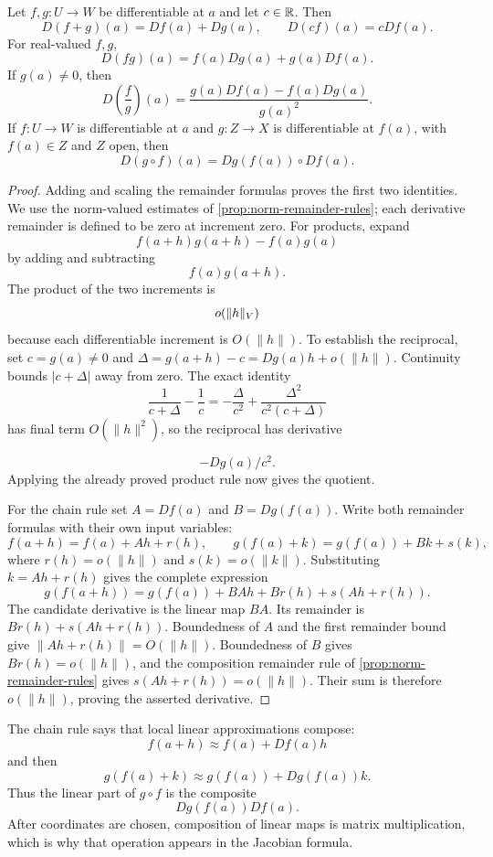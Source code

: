 \begin{proposition}
\label{prop:multivariable-derivative-rules}
Let $f,g:U\to W$ be differentiable at $a$ and let $c\in\mathbb{R}$.  Then
\[
D(f+g)(a)=Df(a)+Dg(a),
\qquad
D(cf)(a)=cDf(a).
\]
For real-valued $f,g$,
\[
D(fg)(a)=f(a)Dg(a)+g(a)Df(a).
\]
If $g(a)\ne0$, then
\[
D\left(\frac fg\right)(a)
=
\frac{g(a)Df(a)-f(a)Dg(a)}{g(a)^2}.
\]
If $f:U\to W$ is differentiable at $a$ and $g:Z\to X$ is differentiable at
$f(a)$, with $f(a)\in Z$ and $Z$ open, then
\[
D(g\circ f)(a)=Dg(f(a))\circ Df(a).
\]
\end{proposition}
\begin{proof}
Adding and scaling the remainder formulas proves the first two identities.
We use the norm-valued estimates of \cref{prop:norm-remainder-rules};
each derivative remainder is defined to be zero at increment zero.
For products, expand
\[
f(a+h)g(a+h)-f(a)g(a)
\]
by adding and subtracting
\[
f(a)g(a+h).
\]
The product of the two increments is
\[
o(\lVert h\rVert_V)
\]
because each differentiable increment is $O(\|h\|)$.
To establish the reciprocal, set $c=g(a)\ne0$ and
$\Delta=g(a+h)-c=Dg(a)h+o(\|h\|)$. Continuity bounds $|c+\Delta|$
away from zero. The exact identity
\[
\frac1{c+\Delta}-\frac1c=-\frac{\Delta}{c^2}
+\frac{\Delta^2}{c^2(c+\Delta)}
\]
has final term $O(\|h\|^2)$, so the reciprocal has derivative

\[
-Dg(a)/c^2.
\]
 Applying the already proved product rule now gives the quotient.

For the chain rule set $A=Df(a)$ and $B=Dg(f(a))$. Write both
remainder formulas with their own input variables:
\[
f(a+h)=f(a)+Ah+r(h),\qquad
g(f(a)+k)=g(f(a))+Bk+s(k),
\]
where $r(h)=o(\|h\|)$ and $s(k)=o(\|k\|)$. Substituting
$k=Ah+r(h)$ gives the complete expression
\[
g(f(a+h))=g(f(a))+BAh+Br(h)+s(Ah+r(h)).
\]
The candidate derivative is the linear map $BA$. Its remainder is
$Br(h)+s(Ah+r(h))$. Boundedness of $A$ and the first remainder bound give
$\|Ah+r(h)\|=O(\|h\|)$. Boundedness of $B$ gives
$Br(h)=o(\|h\|)$, and the composition remainder rule of
\cref{prop:norm-remainder-rules} gives $s(Ah+r(h))=o(\|h\|)$.
Their sum is therefore $o(\|h\|)$, proving the asserted derivative.
\end{proof}

\begin{remark}
The chain rule says that local linear approximations compose:
\[
f(a+h)\approx f(a)+Df(a)h
\]
and then
\[
g(f(a)+k)\approx g(f(a))+Dg(f(a))k.
\]
Thus the linear part of \(g\circ f\) is the composite
\[
Dg(f(a))Df(a).
\]
After coordinates are chosen, composition of linear maps is matrix
multiplication, which is why that operation appears in the Jacobian formula.
\end{remark}

